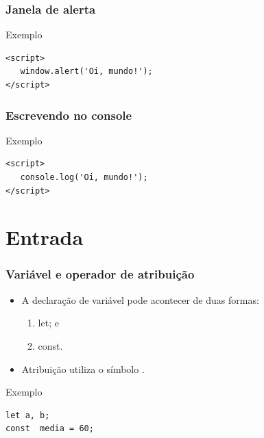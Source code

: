 \documentclass[aspectratio=169]{beamer} %
\begin{document}
\begin{frame}[fragile]
	\frametitle{Janela de alerta}
	
	\begin{exampleblock}{Exemplo}
		\begin{lstlisting}
<script>
   window.alert('Oi, mundo!');
</script>
		\end{lstlisting}
	\end{exampleblock}
\end{frame}

\begin{frame}[fragile]
	\frametitle{Escrevendo no console}
	
	\begin{exampleblock}{Exemplo}
		\begin{lstlisting}
<script>
   console.log('Oi, mundo!');
</script>
		\end{lstlisting}
	\end{exampleblock}
\end{frame}

\section{Entrada}

\begin{frame}[fragile]
	\frametitle{Variável e operador de atribuição}
	
	\begin{itemize}
		\item A declaração de variável pode acontecer de duas formas:
		\begin{enumerate}
			\item let; e
			\item const.
		\end{enumerate}
		\item Atribuição utiliza o símbolo \structure{=}.
	\end{itemize} \vfill
	
	\begin{exampleblock}{Exemplo}
		\begin{lstlisting}
let a, b;
const  media = 60;
		\end{lstlisting}
	\end{exampleblock}
\end{frame}
\end{document}
